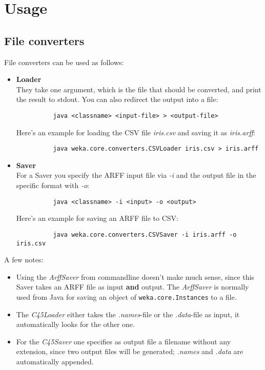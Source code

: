 \section{Usage}

\subsection{File converters}
File converters can be used as follows:

\begin{itemize}
	\item \textbf{Loader} \\
		They take one argument, which is the file that should be converted, and print the result to stdout. You can also redirect the output into a file:
		\begin{verbatim}
 		  java <classname> <input-file> > <output-file>
		\end{verbatim}
		\noindent Here's an example for loading the CSV file \textit{iris.csv} and saving it as \textit{iris.arff}:
		\begin{verbatim}
 		  java weka.core.converters.CSVLoader iris.csv > iris.arff
		\end{verbatim}

	\item \textbf{Saver} \\
		For a Saver you specify the ARFF input file via \textit{-i} and the output file in the specific format with \textit{-o}:
		\begin{verbatim}
		  java <classname> -i <input> -o <output>
		\end{verbatim}
		\noindent Here's an example for saving an ARFF file to CSV:
		\begin{verbatim}
 		  java weka.core.converters.CSVSaver -i iris.arff -o iris.csv
		\end{verbatim}
\end{itemize}

A few notes:

\begin{itemize}
	\item Using the \textit{ArffSaver} from commandline doesn't make much sense, since this Saver takes an ARFF file as input \textbf{and} output. The \textit{ArffSaver} is normally used from Java for saving an object of \texttt{weka.core.Instances} to a file.
	\item The \textit{C45Loader} either takes the \textit{.names}-file or the \textit{.data}-file as input, it automatically looks for the other one.
	\item For the \textit{C45Saver} one specifies as output file a filename without any extension, since two output files will be generated; \textit{.names} and \textit{.data} are automatically appended.
\end{itemize}



